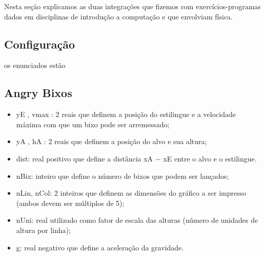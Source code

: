 Nesta seção explicamos as duas integrações que fizemos com exercícios-programas dados em disciplinas de introdução a computação e que envolviam física.

\subsection{Configuração}


os enunciados estão


\subsection{Angry Bixos}

\begin{itemize}
  \item yE , vmax : 2 reais que definem a posição do estilingue e a velocidade máxima com que um bixo pode ser arremessado;
  \item yA , hA : 2 reais que definem a posição do alvo e sua altura;
  \item dist: real positivo que define a distância xA − xE entre o alvo e o estilingue.
  \item nBix: inteiro que define o número de bixos que podem ser lançados;
  \item nLin, nCol: 2 inteiros que definem as dimensões do gráfico a ser impresso (ambos devem ser múltiplos de 5);
  \item nUni: real utilizado como fator de escala das alturas (número de unidades de altura por linha);
  \item g: real negativo que define a aceleração da gravidade.
\end{itemize}

